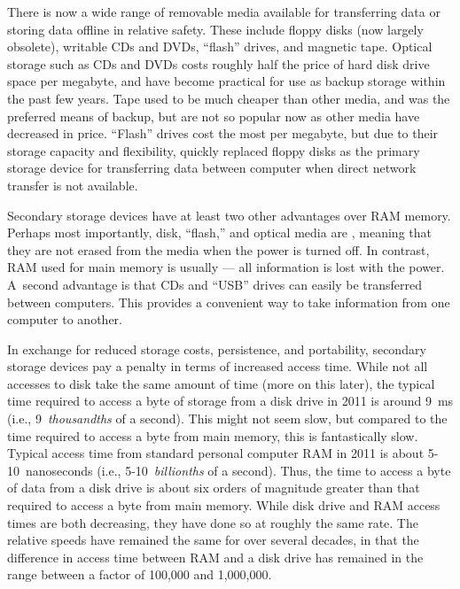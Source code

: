 There is now a wide range of removable media available for
transferring data or storing data offline in relative safety.
These include floppy disks (now largely obsolete), writable CDs and
DVDs, ``flash'' drives, and magnetic tape.
Optical storage such as CDs and DVDs costs roughly half the price of
hard disk drive space per megabyte, and have become practical for use
as backup storage within the past few years.
Tape used to be much cheaper than other media, and was the preferred
means of backup, but are not so popular now as other media have
decreased in price.
``Flash'' drives cost the most per megabyte, but due to their storage
capacity and flexibility, quickly replaced floppy disks as the
primary storage device for transferring data between computer when
direct network transfer is not available.

Secondary storage devices have
at least two other advantages over RAM memory.
Perhaps most importantly, disk, ``flash,'' and optical media are
,
meaning that they are not erased from the media when the power is
turned off.
In contrast, RAM used for main memory is usually  ---
all information is lost with the power.
A~second advantage is that CDs and ``USB'' drives
can easily be transferred between computers.
This provides a convenient way to take information from one computer
to another.

\newpage

In exchange for reduced storage costs, persistence, and
portability, secondary storage devices pay a penalty in terms of
increased access time.
While not all accesses to disk take the same amount of time
(more on this later), the typical time required to access a byte of
storage from a disk drive in 2011 is around 9~ms
(i.e., 9~\emph{thousandths} of a second).
This might not seem slow, but compared to the time required
to access a byte from main memory, this is fantastically slow.
Typical access time from standard personal computer RAM in
2011 is about 5-10~nanoseconds
(i.e., 5-10~\emph{billionths} of a second).
Thus, the time to access a byte of data from a disk drive is about
six orders of magnitude greater than that required to
access a byte from main memory.
While disk drive and RAM access times are both decreasing, they
have done so at roughly the same rate.
The relative speeds have remained the same for over several decades,
in that the difference in access time between RAM and a
disk drive has remained in the range between a factor of 100,000 and
1,000,000.

